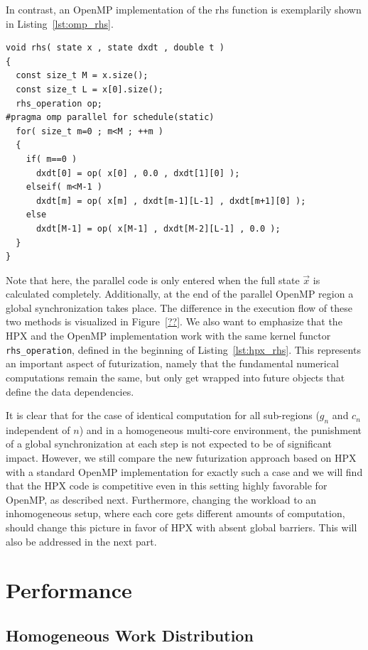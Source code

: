 \documentclass[10pt]{elsarticle}
\begin{document}
In contrast, an OpenMP implementation of the rhs function is exemplarily shown in Listing~\ref{lst:omp_rhs}.
\begin{lstlisting}[label=lst:omp_rhs,caption=OpenMP rhs function,float=t]
void rhs( state x , state dxdt , double t )
{
  const size_t M = x.size();
  const size_t L = x[0].size();
  rhs_operation op;
#pragma omp parallel for schedule(static)
  for( size_t m=0 ; m<M ; ++m )
  {
    if( m==0 )
      dxdt[0] = op( x[0] , 0.0 , dxdt[1][0] );
    elseif( m<M-1 )
      dxdt[m] = op( x[m] , dxdt[m-1][L-1] , dxdt[m+1][0] );
    else
      dxdt[M-1] = op( x[M-1] , dxdt[M-2][L-1] , 0.0 );
  }
}
\end{lstlisting}
Note that here, the parallel code is only entered when the full state $\vec x$ is calculated completely.
Additionally, at the end of the parallel OpenMP region a global synchronization takes place.
The difference in the execution flow of these two methods is visualized in Figure~\ref{??}.
We also want to emphasize that the HPX and the OpenMP implementation work with the same kernel functor \lstinline+rhs_operation+, defined in the beginning of Listing~\ref{lst:hpx_rhs}.
This represents an important aspect of futurization, namely that the fundamental numerical computations remain the same, but only get wrapped into future objects that define the data dependencies.

It is clear that for the case of identical computation for all sub-regions ($g_n$ and $c_n$ independent of $n$) and in a homogeneous multi-core environment, the punishment of a global synchronization at each step is not expected to be of significant impact.
However, we still compare the new futurization approach based on HPX with a standard OpenMP implementation for exactly such a case and we will find that the HPX code is competitive even in this setting highly favorable for OpenMP, as described next.
Furthermore, changing the workload to an inhomogeneous setup, where each core gets different amounts of computation, should change this picture in favor of HPX with absent global barriers.
This will also be addressed in the next part.

\section{Performance} \label{sec:perf}

\subsection{Homogeneous Work Distribution}
\end{document}

